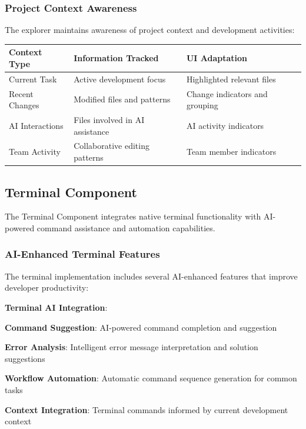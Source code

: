 \subsubsection*{Project Context Awareness}

The explorer maintains awareness of project context and development activities:

\begin{center}
\begin{tabular}{@{}lll@{}}
\toprule
\textbf{Context Type} & \textbf{Information Tracked} & \textbf{UI Adaptation} \\
\midrule
Current Task & Active development focus & Highlighted relevant files \\
Recent Changes & Modified files and patterns & Change indicators and grouping \\
AI Interactions & Files involved in AI assistance & AI activity indicators \\
Team Activity & Collaborative editing patterns & Team member indicators \\
\bottomrule
\end{tabular}
\end{center}

\subsection*{Terminal Component}

The Terminal Component integrates native terminal functionality with AI-powered command assistance and automation capabilities.

\subsubsection*{AI-Enhanced Terminal Features}

The terminal implementation includes several AI-enhanced features that improve developer productivity:

\begin{successbox}
\textbf{Terminal AI Integration}:
\begin{compactlist}
    \item \textbf{Command Suggestion}: AI-powered command completion and suggestion
    \item \textbf{Error Analysis}: Intelligent error message interpretation and solution suggestions
    \item \textbf{Workflow Automation}: Automatic command sequence generation for common tasks
    \item \textbf{Context Integration}: Terminal commands informed by current development context
\end{compactlist}
\end{successbox}

